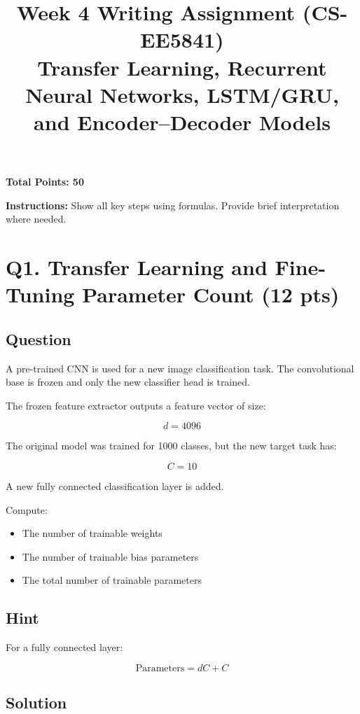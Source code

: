 \documentclass[11pt]{article}
\title{\textbf{Week 4 Writing Assignment (CS-EE5841)}\\Transfer Learning, Recurrent Neural Networks, LSTM/GRU, and Encoder--Decoder Models}
\author{}
\date{}
\begin{document}
\maketitle

\noindent \textbf{Total Points: 50}

\vspace{0.3cm}

\noindent \textbf{Instructions:} Show all key steps using formulas. Provide brief interpretation where needed.

\section*{Q1. Transfer Learning and Fine-Tuning Parameter Count (12 pts)}

\subsection*{Question}

A pre-trained CNN is used for a new image classification task. The convolutional base is frozen and only the new classifier head is trained.

The frozen feature extractor outputs a feature vector of size:

\[
d = 4096
\]

The original model was trained for 1000 classes, but the new target task has:

\[
C = 10
\]

A new fully connected classification layer is added.

Compute:
\begin{itemize}
    \item The number of trainable weights
    \item The number of trainable bias parameters
    \item The total number of trainable parameters
\end{itemize}

\subsection*{Hint}

For a fully connected layer:

\[
\text{Parameters} = dC + C
\]

\subsection*{Solution}
\end{document}
